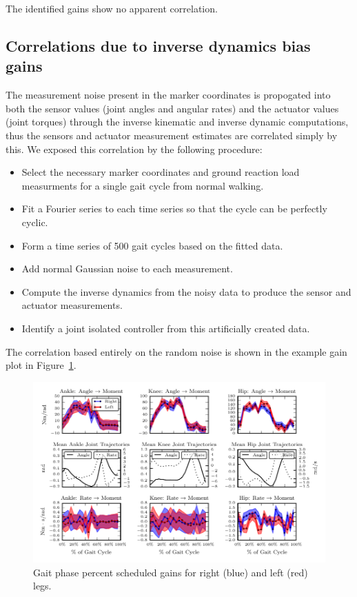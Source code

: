 \documentclass{article}
\begin{document}
The identified gains show no apparent correlation.


\subsection*{Correlations due to inverse dynamics bias gains}
%
The measurement noise present in the marker coordinates is propogated into both
the sensor values (joint angles and angular rates) and the actuator values
(joint torques) through the inverse kinematic and inverse dynamic computations,
thus the sensors and actuator measurement estimates are correlated simply by
this. We exposed this correlation by the following procedure:

\begin{itemize}
  \item Select the necessary marker coordinates and ground reaction load
    measurments for a single gait cycle from normal walking.
  \item Fit a Fourier series to each time series so that the cycle can be
    perfectly cyclic.
  \item Form a time series of 500 gait cycles based on the fitted data.
  \item Add normal Gaussian noise to each measurement.
  \item Compute the inverse dynamics from the noisy data to produce the sensor
    and actuator measurements.
  \item Identify a joint isolated controller from this artificially created
    data.
\end{itemize}

The correlation based entirely on the random noise is shown in the example gain
plot in Figure~\ref{fig:inverse-dynamics=correlation-gains}.
%
\begin{figure}
  \begin{center}
    \includegraphics{figures/example-inverse-dynamics-correlation-gains.pdf}
    \caption{Gait phase percent scheduled gains for right (blue) and left (red) legs.}
    \label{fig:inverse-dynamics=correlation-gains}
  \end{center}
\end{figure}
\end{document}
